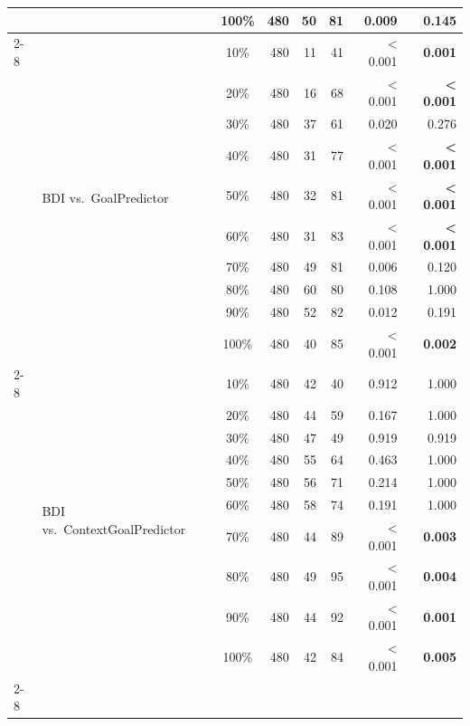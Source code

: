 \begin{table}[t]
\begin{tabular}{llcrrrrr}
     &  & 100\% & 480 & 50 & 81 & 0.009 & 0.145 \\
    \cmidrule(l){2-8}
    \midrule
    \multirow{20}{*}{\texttt{test\_new\_agent}} & \multirow{10}{*}{BDI vs.\ GoalPredictor} & 10\% & 480 & 11 & 41 & < 0.001 & \textbf{0.001} \\
     &  & 20\% & 480 & 16 & 68 & < 0.001 & \textbf{< 0.001} \\
     &  & 30\% & 480 & 37 & 61 & 0.020 & 0.276 \\
     &  & 40\% & 480 & 31 & 77 & < 0.001 & \textbf{< 0.001} \\
     &  & 50\% & 480 & 32 & 81 & < 0.001 & \textbf{< 0.001} \\
     &  & 60\% & 480 & 31 & 83 & < 0.001 & \textbf{< 0.001} \\
     &  & 70\% & 480 & 49 & 81 & 0.006 & 0.120 \\
     &  & 80\% & 480 & 60 & 80 & 0.108 & 1.000 \\
     &  & 90\% & 480 & 52 & 82 & 0.012 & 0.191 \\
     &  & 100\% & 480 & 40 & 85 & < 0.001 & \textbf{0.002} \\
    \cmidrule(l){2-8}
     & \multirow{10}{*}{BDI vs.\ ContextGoalPredictor} & 10\% & 480 & 42 & 40 & 0.912 & 1.000 \\
     &  & 20\% & 480 & 44 & 59 & 0.167 & 1.000 \\
     &  & 30\% & 480 & 47 & 49 & 0.919 & 0.919 \\
     &  & 40\% & 480 & 55 & 64 & 0.463 & 1.000 \\
     &  & 50\% & 480 & 56 & 71 & 0.214 & 1.000 \\
     &  & 60\% & 480 & 58 & 74 & 0.191 & 1.000 \\
     &  & 70\% & 480 & 44 & 89 & < 0.001 & \textbf{0.003} \\
     &  & 80\% & 480 & 49 & 95 & < 0.001 & \textbf{0.004} \\
     &  & 90\% & 480 & 44 & 92 & < 0.001 & \textbf{0.001} \\
     &  & 100\% & 480 & 42 & 84 & < 0.001 & \textbf{0.005} \\
    \cmidrule(l){2-8}
    \bottomrule
  \end{tabular}
\end{table}